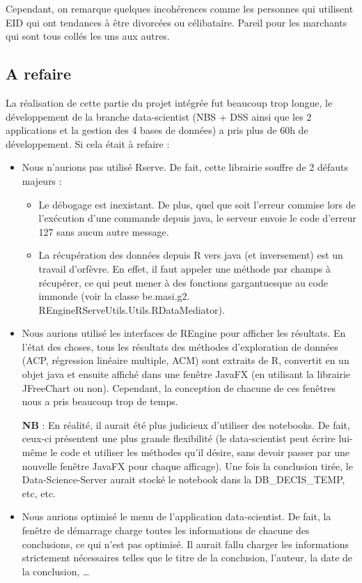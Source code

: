 Cependant, on remarque quelques incohérences comme les personnes qui utilisent EID qui ont
tendances à être divorcées ou célibataire. Pareil pour les marchants qui sont tous collés les uns aux
autres.

\subsection{A refaire}

La réalisation de cette partie du projet intégrée fut beaucoup trop longue, le développement de la
branche data-scientist (NBS + DSS ainsi que les 2 applications et la gestion des 4 bases de données) a
pris plus de 60h de développement. Si cela était à refaire :

\begin{itemize}
    \item Nous n'aurions pas utilisé Rserve. De fait, cette librairie souffre de 2 défauts majeurs :
    \begin{itemize}
        \item Le débogage est inexistant. De plus, quel que soit l'erreur commise lors de l'exécution d'une commande depuis java, le serveur envoie le code d'erreur 127 sans aucun autre message.
        \item La récupération des données depuis R vers java (et inversement) est un travail d'orfèvre. En effet, il faut appeler une méthode par champs à récupérer, ce qui peut mener à des fonctions gargantuesque au code immonde (voir la classe be.masi.g2.
        REngineRServeUtils.Utils.RDataMediator).
    \end{itemize}
    \item Nous aurions utilisé les interfaces de REngine pour afficher les résultats. En l'état des choses,
    tous les résultats des méthodes d'exploration de données (ACP, régression linéaire multiple,
    ACM) sont extraits de R, convertit en un objet java et ensuite affiché dans une fenêtre JavaFX
    (en utilisant la librairie JFreeChart ou non).
    Cependant, la conception de chacune de ces fenêtres nous a pris beaucoup trop de temps.

    \textbf{NB} : En réalité, il aurait été plus judicieux d'utiliser des notebooks. De fait, ceux-ci présentent
une plus grande flexibilité (le data-scientist peut écrire lui-même le code et utiliser les
méthodes qu'il désire, sans devoir passer par une nouvelle fenêtre JavaFX pour chaque
afficage). Une fois la conclusion tirée, le Data-Science-Server aurait stocké le notebook dans la
DB\_DECIS\_TEMP, etc, etc.

    \item Nous aurions optimisé le menu de l'application data-scientist. De fait, la fenêtre de démarrage
    charge toutes les informations de chacune des conclusions, ce qui n'est pas optimisé. Il aurait
    fallu charger les informations strictement nécessaires telles que le titre de la conclusion,
    l'auteur, la date de la conclusion, …
\end{itemize}

